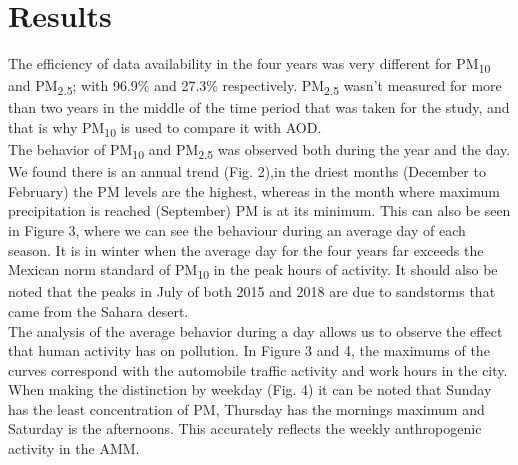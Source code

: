 \section{Results}
The efficiency of data availability in the four years was very different for PM\textsubscript{10} and
PM\textsubscript{2.5}; with 96.9\% and 27.3\% respectively. PM\textsubscript{2.5} wasn’t measured for
more than two years in the middle of the time period that was taken for the study, and that is why
PM\textsubscript{10} is used to compare it with AOD.\\

The behavior of PM\textsubscript{10} and PM\textsubscript{2.5} was observed both during the year and the day.
We found  there is an annual trend (Fig. 2),in the driest months (December to February) the PM levels are
the highest, whereas in the month where maximum precipitation is reached (September) PM is at its minimum.
This can also be seen in Figure 3, where we can see the behaviour during an average day of each season.
It is in winter when the average day for the four years far exceeds the Mexican norm standard of PM\textsubscript{10}
in the peak hours of activity. It should also be noted that the peaks in July of both 2015 and 2018
are due to sandstorms that came from the Sahara desert.\\

The analysis of the average behavior during a day allows us to observe the effect that human activity
has on pollution. In Figure 3 and 4, the maximums of the curves correspond with the automobile traffic
activity and work hours in the city. When making the distinction by weekday (Fig. 4) it can be noted that
Sunday has the least concentration of PM, Thursday has the mornings maximum and Saturday is the afternoons.
This accurately reflects the weekly anthropogenic activity in the AMM.

